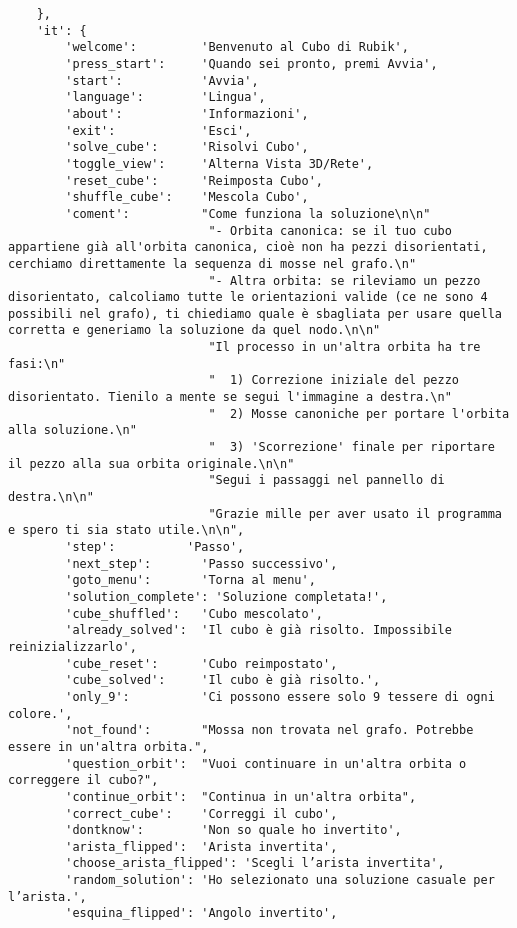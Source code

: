 \begin{lstlisting}
    },
    'it': {
        'welcome':         'Benvenuto al Cubo di Rubik',
        'press_start':     'Quando sei pronto, premi Avvia',
        'start':           'Avvia',
        'language':        'Lingua',
        'about':           'Informazioni',
        'exit':            'Esci',
        'solve_cube':      'Risolvi Cubo',
        'toggle_view':     'Alterna Vista 3D/Rete',
        'reset_cube':      'Reimposta Cubo',
        'shuffle_cube':    'Mescola Cubo',
        'coment':          "Come funziona la soluzione\n\n"
                            "- Orbita canonica: se il tuo cubo appartiene già all'orbita canonica, cioè non ha pezzi disorientati, cerchiamo direttamente la sequenza di mosse nel grafo.\n"
                            "- Altra orbita: se rileviamo un pezzo disorientato, calcoliamo tutte le orientazioni valide (ce ne sono 4 possibili nel grafo), ti chiediamo quale è sbagliata per usare quella corretta e generiamo la soluzione da quel nodo.\n\n"
                            "Il processo in un'altra orbita ha tre fasi:\n"
                            "  1) Correzione iniziale del pezzo disorientato. Tienilo a mente se segui l'immagine a destra.\n"
                            "  2) Mosse canoniche per portare l'orbita alla soluzione.\n"
                            "  3) 'Scorrezione' finale per riportare il pezzo alla sua orbita originale.\n\n"
                            "Segui i passaggi nel pannello di destra.\n\n"
                            "Grazie mille per aver usato il programma e spero ti sia stato utile.\n\n",
        'step':          'Passo',
        'next_step':       'Passo successivo',
        'goto_menu':       'Torna al menu',
        'solution_complete': 'Soluzione completata!',
        'cube_shuffled':   'Cubo mescolato',
        'already_solved':  'Il cubo è già risolto. Impossibile reinizializzarlo',
        'cube_reset':      'Cubo reimpostato',
        'cube_solved':     'Il cubo è già risolto.',
        'only_9':          'Ci possono essere solo 9 tessere di ogni colore.',
        'not_found':       "Mossa non trovata nel grafo. Potrebbe essere in un'altra orbita.",
        'question_orbit':  "Vuoi continuare in un'altra orbita o correggere il cubo?",
        'continue_orbit':  "Continua in un'altra orbita",
        'correct_cube':    'Correggi il cubo',
        'dontknow':        'Non so quale ho invertito',
        'arista_flipped':  'Arista invertita',
        'choose_arista_flipped': 'Scegli l’arista invertita',
        'random_solution': 'Ho selezionato una soluzione casuale per l’arista.',
        'esquina_flipped': 'Angolo invertito',

\end{lstlisting}
